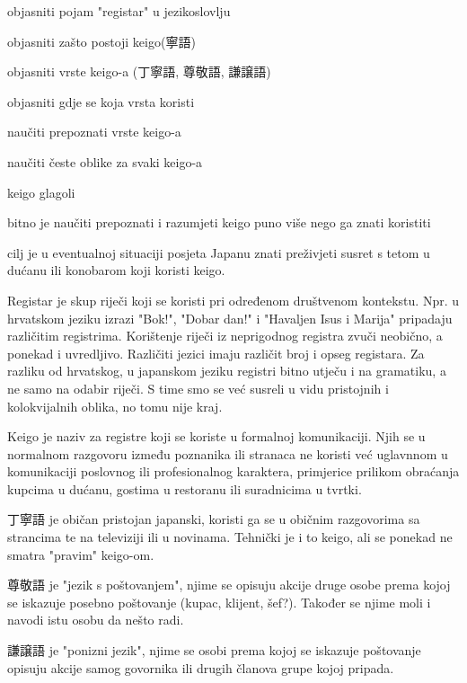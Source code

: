 
\author{Ivan Petranović}

	
	
	\begin{hyou}
		\item objasniti pojam "registar" u jezikoslovlju
		\item objasniti zašto postoji keigo(寧語)
		\item objasniti vrste keigo-a (丁寧語, 尊敬語, 謙譲語)
		\item objasniti gdje se koja vrsta koristi
		\item naučiti prepoznati vrste keigo-a
		\item naučiti česte oblike za svaki keigo-a
		\item keigo glagoli
	\end{hyou}

	
	\begin{hyou}
		\item bitno je naučiti prepoznati i razumjeti keigo puno više nego ga znati koristiti
		\item cilj je u eventualnoj situaciji posjeta Japanu znati preživjeti susret s tetom u dućanu ili konobarom koji koristi keigo.
	\end{hyou}

	
	Registar je skup riječi koji se koristi pri određenom društvenom kontekstu. Npr. u hrvatskom jeziku izrazi "Bok!", "Dobar dan!" i "Havaljen Isus i Marija" pripadaju različitim registrima. Korištenje riječi iz neprigodnog registra zvuči neobično, a ponekad i uvredljivo. Različiti jezici imaju različit broj i opseg registara. Za razliku od hrvatskog, u japanskom jeziku registri bitno utječu i na gramatiku, a ne samo na odabir riječi. S time smo se već susreli u vidu pristojnih i kolokvijalnih oblika, no tomu nije kraj.
	
	Keigo je naziv za registre koji se koriste u formalnoj komunikaciji. Njih se u normalnom razgovoru između poznanika ili stranaca ne koristi već uglavnnom u komunikaciji poslovnog ili profesionalnog karaktera, primjerice prilikom obraćanja kupcima u dućanu, gostima u restoranu ili suradnicima u tvrtki.
	
	丁寧語 je običan pristojan japanski, koristi ga se u običnim razgovorima sa strancima te na televiziji ili u novinama. Tehnički je i to keigo, ali se ponekad ne smatra "pravim" keigo-om.
	
	尊敬語 je "jezik s poštovanjem", njime se opisuju akcije druge osobe prema kojoj se iskazuje posebno poštovanje (kupac, klijent, šef?). Također se njime moli i navodi istu osobu da nešto radi.
	
	謙譲語 je "ponizni jezik", njime se osobi prema kojoj se iskazuje poštovanje opisuju akcije samog govornika ili drugih članova grupe kojoj pripada.
